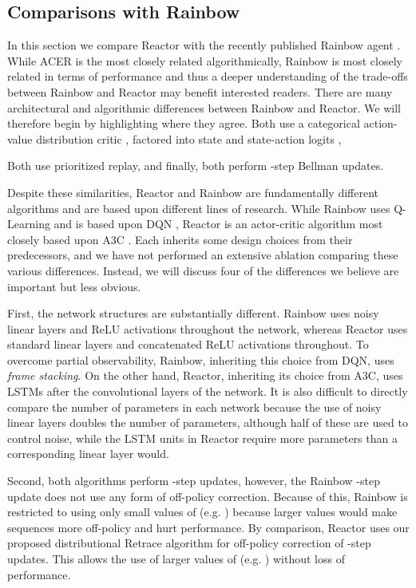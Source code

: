 \documentclass{article}
\begin{document}
\subsection{Comparisons with Rainbow}
In this section we compare Reactor with the recently published Rainbow agent 
\citep{rainbow}. While ACER is the most closely related algorithmically, Rainbow 
is most closely related in terms of performance and thus a deeper understanding 
of the trade-offs between Rainbow and Reactor may benefit interested readers. 
There are many architectural and algorithmic differences between Rainbow and 
Reactor. We will therefore begin by highlighting where they agree. Both use a 
categorical action-value distribution critic 
\citep{bellemare2017distributional}, factored into state and state-action logits 
\citep{wang2015dueling},

Both use prioritized replay, and finally, both perform -step Bellman updates.

Despite these similarities, Reactor and Rainbow are fundamentally different 
algorithms and are based upon different lines of research. While Rainbow uses 
Q-Learning and is based upon DQN \citep{mnih15human}, Reactor is an actor-critic 
algorithm most closely based upon A3C \citep{mnih2016asynchronous}. Each 
inherits some design choices from their predecessors, and we have not performed 
an extensive ablation comparing these various differences. Instead, we will 
discuss four of the differences we believe are important but less obvious.

First, the network structures are substantially different. Rainbow uses noisy 
linear layers and ReLU activations throughout the network, whereas Reactor uses 
standard linear layers and concatenated ReLU activations throughout. To overcome 
partial observability, Rainbow, inheriting this choice from DQN, uses 
\textit{frame stacking}. On the other hand, Reactor, inheriting its choice from 
A3C, uses LSTMs after the convolutional layers of the network. It is also 
difficult to directly compare the number of parameters in each network because 
the use of noisy linear layers doubles the number of parameters, although half 
of these are used to control noise, while the LSTM units in Reactor require more 
parameters than a corresponding linear layer would.

Second, both algorithms perform -step updates, however, the Rainbow -step 
update does not use any form of off-policy correction. Because of this, Rainbow 
is restricted to using only small values of  (e.g. ) because larger 
values would make sequences more off-policy and hurt performance. By comparison, 
Reactor uses our proposed distributional Retrace algorithm for off-policy 
correction of -step updates. This allows the use of larger values of  
(e.g. ) without loss of performance.
\end{document}
